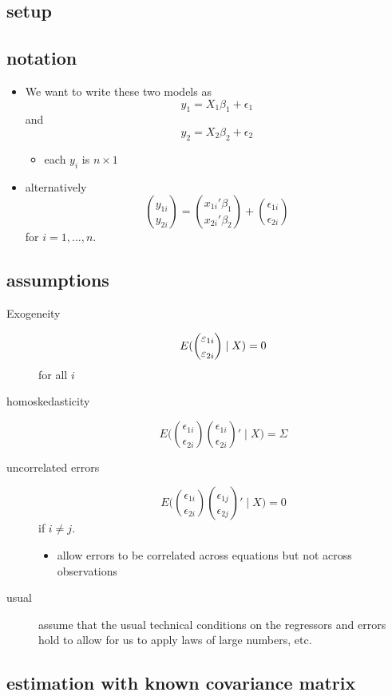 \subsection{setup}
\subsection{notation}

\begin{itemize}
\item We want to write these two models as
       \[y_1 = X_1 \beta_1 + \epsilon_1\]
       and
       \[y_2 = X_2 \beta_2 + \epsilon_2\]
\begin{itemize}
\item each $y_i$ is $n \times 1$
\end{itemize}
\item alternatively
  \[ \binom{y_{1i}}{y_{2i}} = \binom{x_{1i}'\beta_1}{x_{2i}'\beta_2} + 
  \binom{\epsilon_{1i}}{ \epsilon_{2i}}\]
       for $i = 1,...,n$.
\end{itemize}

\subsection{assumptions}

\begin{description}
\item[Exogeneity] \[E(\binom{\varepsilon_{1i}}{\varepsilon_{2i}} \mid X) = 0\] for all $i$
\item[homoskedasticity] \[E\Big(\binom{\epsilon_{1i}}{\epsilon_{2i}} \binom{\epsilon_{1i}}{\epsilon_{2i}}' \mid X \Big) = \Sigma\]
\item[uncorrelated errors] \[E\Big(\binom{\epsilon_{1i}}{\epsilon_{2i}}
  \binom{\epsilon_{1j}}{\epsilon_{2j}}' \mid X \Big) = 0\] if $i \neq j$.
\begin{itemize}
\item allow errors to be correlated across equations but not across
         observations
\end{itemize}
\item[usual] assume that the usual technical conditions on the
                regressors and errors hold to allow for us to apply
                laws of large numbers, etc.
\end{description}

\subsection{estimation with known covariance matrix}

